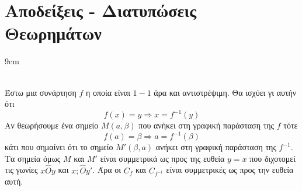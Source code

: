 \section{Αποδείξεις - Διατυπώσεις Θεωρημάτων}

\begin{Thewrhmabox}{9cm}
\label{thewrhma:symmetria_antistrofhs}
\\
\end{Thewrhmabox}
\textbf{}\\
Έστω μια συνάρτηση $ f $ η οποία είναι $ 1-1 $ άρα και αντιστρέψιμη. Θα ισχύει γι αυτήν ότι
\[ f(x)=y\Rightarrow x=f^{-1}(y) \]
Αν θεωρήσουμε ένα σημείο $ M(a,\beta) $ που ανήκει στη γραφική παράσταση της $ f $ τότε
\[ f(a)=\beta\Rightarrow a=f^{-1}(\beta) \]
κάτι που σημαίνει ότι το σημείο $ M'(\beta,a) $ ανήκει στη γραφική παράσταση της $ f^{-1} $. Τα σημεία όμως $ M $ και $ M' $ είναι συμμετρικά ως προς της ευθεία $ y=x $ που διχοτομεί τις γωνίες $ x\hat{O}y $ και $ x;\hat{O}y' $. Άρα οι $ C_f $ και $ C_{f^{-1}} $ είναι συμμετρικές ως προς την ευθεία αυτή.

